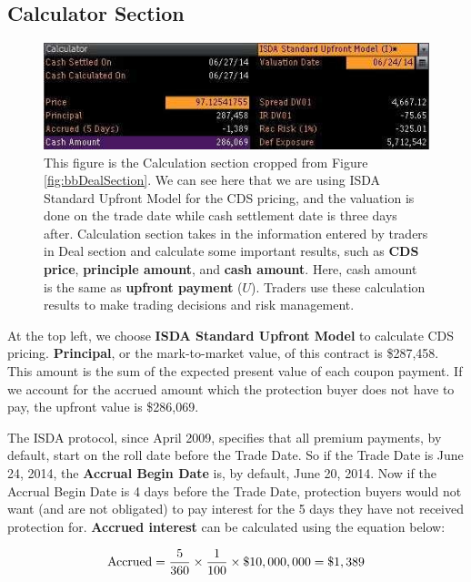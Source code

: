 \documentclass{jss}
\begin{document}
\subsection{Calculator Section}
\label{Calculator section}
\begin{figure}[H]
\centering
\includegraphics{images/AlcoaIncCDSCalculator.jpg}
\caption{
This figure is the Calculation section cropped from Figure \ref{fig:bbDealSection}. We can see here that we are using ISDA Standard Upfront Model for the CDS pricing, and the valuation is done on the trade date while cash settlement date is three days after. Calculation section takes in the information entered by traders in Deal section and calculate some important results,  such as \textbf{CDS price}, \textbf{principle amount}, and \textbf{cash amount}. Here, cash amount is the same as \textbf{upfront payment} ($U$). Traders use these calculation results to make trading decisions and risk management.}
\label{AlcoaIncCDSCalculator}
\end{figure}

At the top left, we choose \textbf{ISDA Standard Upfront Model} to calculate CDS pricing. \textbf{Principal}, or the mark-to-market value, of this contract is \$287,458. This amount is the sum of the expected present value of each coupon payment. If we account for the accrued amount which the protection buyer does not have to pay, the upfront value is \$286,069. 

The ISDA protocol, since April 2009, specifies that all premium payments, by default, start on the roll date before the Trade Date. So if the Trade Date is June 24, 2014, the \textbf{Accrual Begin Date} is, by default, June 20, 2014. Now if the Accrual Begin Date is 4 days before the Trade Date, protection buyers would not want (and are not obligated) to pay interest for the 5 days they have not received protection for. \textbf{Accrued interest} can be calculated using the equation below:

\begin{equation}
 \begin{aligned}
  {\rm Accrued = \frac{5}{360} \times \frac{1}{100} \times \$10,000,000 = \$1,389}
    \end{aligned}
\end{equation}
\end{document}
